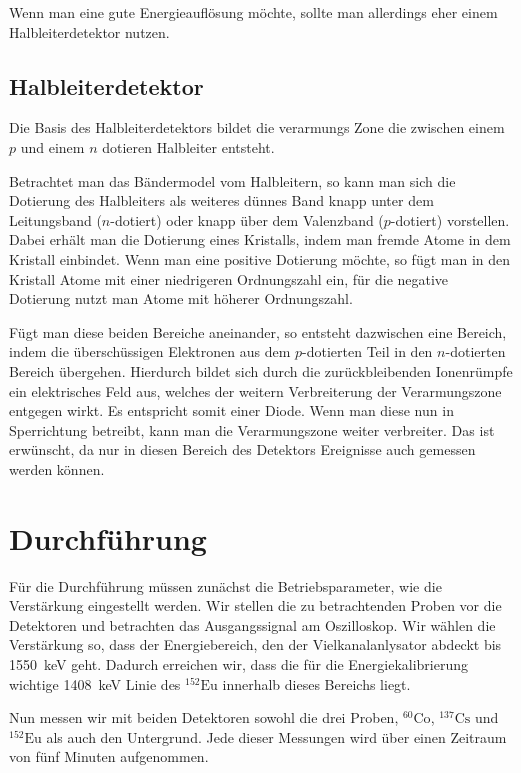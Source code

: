 \documentclass[11pt, ngerman, fleqn, DIV=15, headinclude, BCOR=2cm]{scrreprt}
\begin{document}
Wenn man eine gute Energieauflösung möchte, sollte man allerdings eher einem
Halbleiterdetektor nutzen.

\section{Halbleiterdetektor}
Die Basis des Halbleiterdetektors bildet die verarmungs Zone die zwischen einem
$p$ und einem $n$ dotieren Halbleiter entsteht.

Betrachtet man das Bändermodel vom Halbleitern, so kann man sich die Dotierung
des Halbleiters als weiteres dünnes Band knapp unter dem Leitungsband
($n$-dotiert) oder knapp über dem Valenzband ($p$-dotiert) vorstellen.
Dabei erhält man die Dotierung eines Kristalls, indem man fremde Atome in dem
Kristall einbindet.
Wenn man eine positive Dotierung möchte, so fügt man in den Kristall Atome mit einer
niedrigeren Ordnungszahl ein, für die negative Dotierung nutzt man  Atome mit
höherer Ordnungszahl.

Fügt man diese beiden Bereiche aneinander, so entsteht dazwischen eine Bereich,
indem die überschüssigen Elektronen aus dem $p$-dotierten Teil in den
$n$-dotierten Bereich übergehen.
Hierdurch bildet sich durch die zurückbleibenden Ionenrümpfe ein elektrisches Feld aus, welches
der weitern Verbreiterung der Verarmungszone entgegen wirkt.
Es entspricht somit einer Diode.
Wenn man diese nun in Sperrichtung betreibt, kann man die Verarmungszone weiter
verbreiter.
Das ist erwünscht, da nur in diesen Bereich des Detektors Ereignisse auch
gemessen werden können.

\chapter{Durchführung}

Für die Durchführung müssen zunächst die Betriebsparameter, wie die
Verstärkung eingestellt werden. Wir stellen die zu betrachtenden Proben vor die
Detektoren und betrachten das Ausgangssignal am Oszilloskop. Wir wählen die
Verstärkung so, dass der Energiebereich, den der Vielkanalanlysator abdeckt bis
\SI{1550}{\kilo\electronvolt} geht. Dadurch erreichen wir, dass die für die
Energiekalibrierung wichtige \SI{1408}{\kilo\electronvolt} Linie des
$^{152}\text{Eu}$
innerhalb dieses Bereichs liegt.

Nun messen wir mit beiden Detektoren sowohl die drei Proben, $^{60}\text{Co}$,
$^{137}\text{Cs}$ und $^{152}\text{Eu}$ als auch den Untergrund. Jede dieser
Messungen wird über einen Zeitraum von fünf Minuten aufgenommen.
\end{document}
